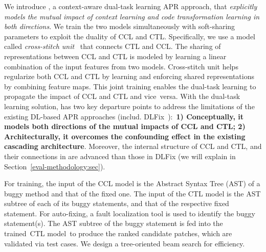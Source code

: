 
We introduce {\tool}, a context-aware dual-task learning APR approach,
that {\em explicitly models the mutual impact of context learning and
  code transformation learning in both directions}. We train the two
models simultaneously with soft-sharing parameters to exploit the
duality of CCL and CTL. Specifically, we use a model called {\em
  cross-stitch unit}~\cite{misra2016cross} that connects CTL and
CCL. The sharing of representations between CCL and CTL is modeled by
learning a linear combination of the input features from two
models. Cross-stitch unit helps regularize both CCL and CTL by
learning and enforcing shared representations by combining feature
maps. This joint training enables the dual-task learning to propagate
the impact of CCL and CTL and vice~versa. With the dual-task learning
solution, {\tool} has two key departure points to address the
limitations of the existing DL-based APR approaches
(includ. DLFix~\cite{icse20}):~{\bf 1) Conceptually, it models both
  directions of the mutual impacts of CCL and CTL; 2) Architecturally,
  it overcomes the confounding effect in the existing cascading
  architecture}. Moreover, the internal structure of CCL and CTL, and
their connections in {\tool} are advanced than those in DLFix (we will
explain in Section~\ref{eval-methodology:sec}).

For training, the input of the CCL model is the Abstract
Syntax Tree (AST) of a buggy method and that of the fixed one.
The input of the CTL model is the AST subtree of each of its buggy
statements, and that of the respective fixed statement. For
auto-fixing, a fault localization tool is used to identify the buggy
statement(s). The AST subtree of the buggy statement is fed into the
trained~CTL model~to produce the ranked candidate patches, which are
validated via test cases. We design a tree-oriented beam search
for efficiency.


